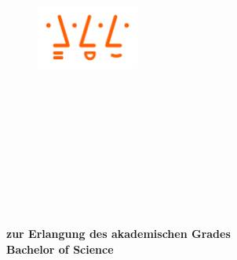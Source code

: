 \thispagestyle{empty}

\begin{figure}[t]
 \centering
 \includegraphics[width=0.3\textwidth]{abb/logoHSA}
\end{figure}


\begin{verbatim}


\end{verbatim}

\begin{center}
\Large{\institution}
\end{center}


\begin{center}
\Large{\insSection}
\end{center}
\begin{verbatim}




\end{verbatim}
\begin{center}
\doublespacing
\textbf{\LARGE{\titleDocument}}
\singlespacing
\begin{verbatim}

\end{verbatim}
\textbf{{~\subjectDocument~}}
\end{center}
\begin{verbatim}

\end{verbatim}
\begin{center}

\end{center}
\begin{verbatim}

\end{verbatim}
\begin{center}
\textbf{zur Erlangung des akademischen Grades \\ Bachelor of Science}
\end{center}
\begin{verbatim}





\end{verbatim}

